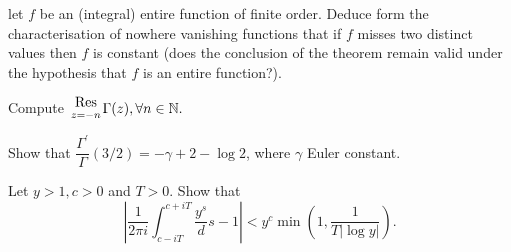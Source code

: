 \documentclass[12pt]{article}
\newcommand{\N}{\mathbb{N}}
\newenvironment{exercise}[2][Exercise]{\begin{trivlist}
\item[\hskip \labelsep {\bfseries #1}\hskip \labelsep {\bfseries #2.}]}{\end{trivlist}}
\begin{document}
\begin{exercise}{10}
let $f$ be an (integral) entire function of finite order. 
Deduce form the characterisation of nowhere vanishing functions that if $f$ misses two distinct 
values then $f$ is constant (does the conclusion of the theorem remain valid under the hypothesis that $f$ is an entire function?).
\end{exercise}
\begin{exercise}{11}
Compute $\genfrac{}{}{0pt}{1}{\displaystyle\operatorname{Res}}{z=-n}\Gamma(z), \forall n\in\N.$
\end{exercise}
\begin{exercise}{12}
Show that $\dfrac{\Gamma^{'}}{\Gamma}(3/2)=-\gamma+2-\log2$, where $\gamma$ Euler constant.
\end{exercise}
\begin{exercise}{13}
Let $y>1, c>0$ and $T>0$. Show that 
$$\left|\frac1{2\pi i}\int_{c-iT}^{c+iT}\frac{y^s}ds-1\right|< y^{c}\min\left(1,\dfrac{1}{T|\log y|}\right).$$
\end{exercise}
\end{document}
